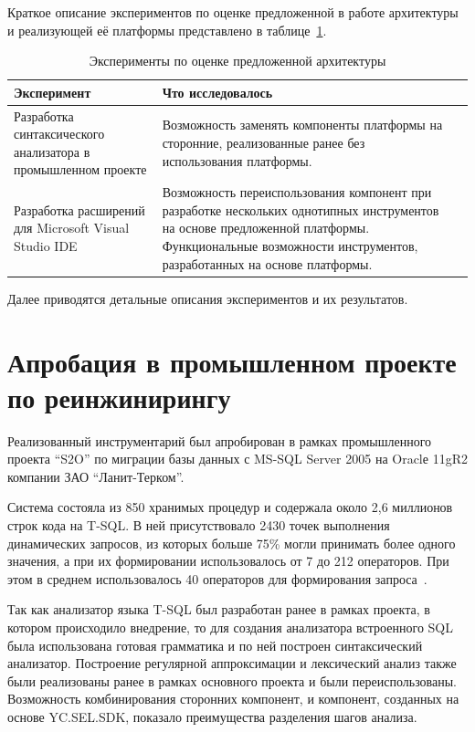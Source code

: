Краткое описание экспериментов по оценке предложенной в работе архитектуры и реализующей её платформы представлено в таблице~\ref{tbl:ArchEval}.

\begin{table} [htbp]
  \centering
  \parbox{15cm}{\caption{Эксперименты по оценке предложенной архитектуры}\label{tbl:ArchEval}}
  \begin{tabular}{| p{6cm} | p{9cm}l |}
  \hline                               
  \hline
  Эксперимент & Что исследовалось & \\
  \hline 
  \hline
  Разработка синтаксического анализатора в промышленном проекте & Возможность заменять компоненты платформы на сторонние, реализованные ранее без использования платформы. & \\
    \hline
  Разработка расширений для Microsoft Visual Studio IDE         & Возможность переиспользования компонент при разработке нескольких однотипных инструментов на основе предложенной платформы. Функциональные возможности инструментов, разработанных на основе платформы. & \\
  \hline
  \hline
  \end{tabular}
\end{table}

Далее приводятся детальные описания экспериментов и их результатов.


\section{Апробация в промышленном проекте по реинжинирингу}

Реализованный инструментарий был апробирован в рамках промышленного проекта ``S2O'' по миграции базы данных с MS-SQL Server 2005 на Oraclе 11gR2 компании ЗАО ``Ланит-Терком''.

Система состояла из 850 хранимых процедур и содержала около 2,6 миллионов строк кода на T-SQL. В ней присутствовало 2430 точек выполнения динамических запросов, из которых больше 75\% могли принимать более 
одного значения, а при их формировании использовалось от 7 до 212 операторов. При этом в среднем использовалось 40 операторов для формирования запроса~\cite{Syrcose}.

Так как анализатор языка T-SQL был разработан ранее в рамках проекта, в котором происходило внедрение, то для создания анализатора встроенного SQL была использована готовая грамматика и по ней построен 
синтаксический анализатор. Построение регулярной аппроксимации и лексический анализ также были реализованы ранее в рамках основного проекта и были переиспользованы. Возможность комбинирования сторонних компонент, 
и компонент, созданных на основе YC.SEL.SDK, показало преимущества разделения шагов анализа.

